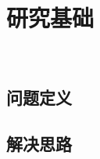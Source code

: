 \section{研究基础}
\
\subsection{问题定义}
\begin{frame}{\insertsection}{\insertsubsection}
\end{frame}
\subsection{解决思路}
\begin{frame}{\insertsection}{\insertsubsection}
\end{frame}

\begin{frame}{\insertsection}{\insertsubsection}
\end{frame}
